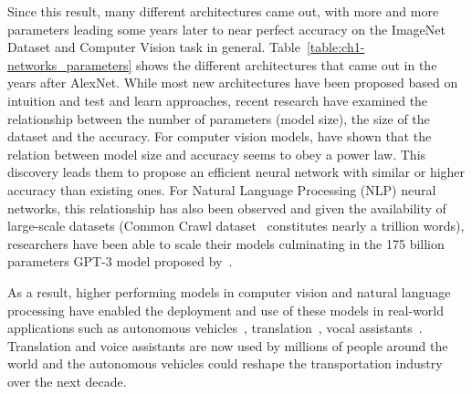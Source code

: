 Since this result, many different architectures came out, with more and more parameters leading some years later to near perfect accuracy on the ImageNet Dataset and Computer Vision task in general.
Table~\ref{table:ch1-networks_parameters} shows the different architectures that came out in the years after AlexNet.
While most new architectures have been proposed based on intuition and test and learn approaches, recent research \cite{tan2019efficientnet,rosenfeld2020a} have examined the relationship between the number of parameters (model size), the size of the dataset and the accuracy.
For computer vision models, \citet{tan2019efficientnet} have shown that the relation between model size and accuracy seems to obey a power law. 
This discovery leads them to propose an efficient neural network with similar or higher accuracy than existing ones.  
For Natural Language Processing (NLP) neural networks, this relationship has also been observed and given the availability of large-scale datasets (Common Crawl dataset~\cite{raffel2019exploring} constitutes nearly a trillion words), researchers have been able to scale their models culminating in the 175 billion parameters GPT-3 model proposed by~\citet{brown2020language}. 

As a result, higher performing models in computer vision and natural language processing have enabled the deployment and use of these models in real-world applications such as autonomous vehicles~\cite{fagnant2015preparing}, translation~\cite{wu2016google}, vocal assistants~\cite{li2017acoustic}.
Translation and voice assistants are now used by millions of people around the world and the autonomous vehicles could reshape the transportation industry over the next decade.







